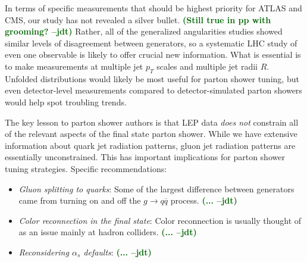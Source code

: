 \documentclass[11pt]{cernrep}
\newcommand{\jdt}[1]{\textbf{\textcolor{darkgreen}{(#1 --jdt)}}}
\begin{document}
In terms of specific measurements that should be highest priority for ATLAS and CMS, our study has not revealed a silver bullet.  \jdt{Still true in pp with grooming?}  Rather, all of the generalized angularities studies showed similar levels of disagreement between generators, so a systematic LHC study of even one observable is likely to offer crucial new information.  What is essential is to make measurements at multiple jet $p_T$ scales and multiple jet radii $R$.  Unfolded distributions would likely be most useful for parton shower tuning, but even detector-level measurements compared to detector-simulated parton showers would help spot troubling trends.

The key lesson to parton shower authors is that LEP data \emph{does not} constrain all of the relevant aspects of the final state parton shower.  While we have extensive information about quark jet radiation patterns, gluon jet radiation patterns are essentially unconstrained.  This has important implications for parton shower tuning strategies.  Specific recommendations:
\begin{itemize}
\item \textit{Gluon splitting to quarks}:  Some of the largest difference between generators came from turning on and off the $g \to q \overline{q}$ process.  \jdt{...}
\item \textit{Color reconnection in the final state}:  Color reconnection is usually thought of as an issue mainly at hadron colliders.  \jdt{...}
\item \textit{Reconsidering $\alpha_s$ defaults}:  \jdt{...}
\end{itemize}



\end{document}
